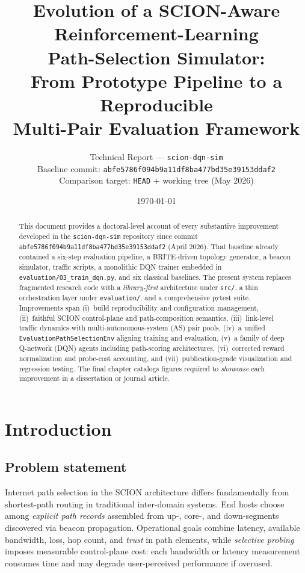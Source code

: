 \documentclass[11pt,a4paper,twoside,openright]{report}
\title{%
  \textbf{Evolution of a SCION-Aware Reinforcement-Learning}\\[0.4em]
  \textbf{Path-Selection Simulator:}\\[0.2em]
  From Prototype Pipeline to a Reproducible\\[0.2em]
  Multi-Pair Evaluation Framework}
\author{Technical Report --- \texttt{scion-dqn-sim}\\[0.3em]
  Baseline commit: \texttt{abfe5786f094b9a11df8ba477bd35e39153ddaf2}\\
  Comparison target: \texttt{HEAD} + working tree (May 2026)}
\date{\today}
\begin{document}
\maketitle

\begin{abstract}
This document provides a doctoral-level account of every substantive improvement
developed in the \texttt{scion-dqn-sim} repository since commit
\texttt{abfe5786f094b9a11df8ba477bd35e39153ddaf2} (April 2026).
That baseline already contained a six-step evaluation pipeline, a BRITE-driven
topology generator, a beacon simulator, traffic scripts, a monolithic DQN trainer
embedded in \texttt{evaluation/03\_train\_dqn.py}, and six classical baselines.
The present system replaces fragmented research code with a \emph{library-first}
architecture under \texttt{src/}, a thin orchestration layer under
\texttt{evaluation/}, and a comprehensive pytest suite.
Improvements span (i)~build reproducibility and configuration management,
(ii)~faithful SCION control-plane and path-composition semantics,
(iii)~link-level traffic dynamics with multi-autonomous-system (AS) pair pools,
(iv)~a unified \texttt{EvaluationPathSelectionEnv} aligning training and evaluation,
(v)~a family of deep Q-network (DQN) agents including path-scoring architectures,
(vi)~corrected reward normalization and probe-cost accounting, and
(vii)~publication-grade visualization and regression testing.
The final chapter catalogs figures required to \emph{showcase} each improvement
in a dissertation or journal article.
\end{abstract}

\tableofcontents
\listoffigures
\listoftables

\chapter{Introduction}

\section{Problem statement}

Internet path selection in the SCION architecture differs fundamentally from
shortest-path routing in traditional inter-domain systems.
End hosts choose among \emph{explicit path records} assembled from up-, core-, and
down-segments discovered via beacon propagation.
Operational goals combine latency, available bandwidth, loss, hop count, and
\emph{trust} in path elements, while \emph{selective probing} imposes measurable
control-plane cost: each bandwidth or latency measurement consumes time and may
degrade user-perceived performance if overused.
\end{document}
